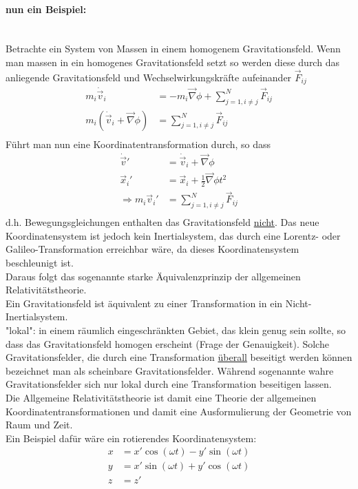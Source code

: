 \documentclass[a4paper]{article}
\begin{document}
\paragraph{nun ein Beispiel:}~\\
Betrachte ein System von Massen in einem homogenem Gravitationsfeld.
Wenn man massen in ein homogenes Gravitationsfeld setzt so werden diese durch
das anliegende Gravitationsfeld und Wechselwirkungskräfte aufeinander
$\vec{F}_{ij}$
\begin{align}
m_i \dot{\vec{v}}_i&=-m_i\vec{\nabla}\phi+\sum_{j=1,i\neq j}^N\vec{F}_{ij}\\
m_i (\dot{\vec{v}}_i+\vec{\nabla}\phi)&=\sum_{j=1,i\neq j}^N\vec{F}_{ij}\\
\end{align}
Führt man nun eine Koordinatentransformation durch, so dass
\begin{align}
\dot{\vec{v}}{}'&=\dot{\vec{v}}_i+\vec{\nabla}\phi\\
\vec{x}_i{}'&=\vec{x}_i+\frac{1}{2}\vec{\nabla}\phi t^2\\
\Rightarrow m_i\vec{v}_i{}'&=\sum_{j=1,i\neq j}^N\vec{F}_{ij}\\
\end{align}
d.h. Bewegungsgleichungen enthalten das Gravitationsfeld \underline{nicht}. Das
neue Koordinatensystem ist jedoch kein Inertialsystem, das durch eine
Lorentz- oder Galileo-Transformation erreichbar wäre, da dieses
Koordinatensystem beschleunigt ist.\\
Daraus folgt das sogenannte starke Äquivalenzprinzip der allgemeinen
Relativitätstheorie.\\
Ein Gravitationsfeld ist äquivalent zu einer Transformation in ein
Nicht- Inertialsystem.\\
"lokal": in einem räumlich eingeschränkten Gebiet, das klein genug sein sollte,
so dass das Gravitationsfeld homogen erscheint (Frage der Genauigkeit).
Solche Gravitationsfelder, die durch eine Transformation \underline{überall}
beseitigt werden können bezeichnet man als scheinbare Gravitationsfelder.
Während sogenannte wahre Gravitationsfelder sich nur lokal durch eine
Transformation beseitigen lassen.\\
Die Allgemeine Relativitätstheorie ist damit eine Theorie der allgemeinen
Koordinatentransformationen und damit eine Ausformulierung der Geometrie von
Raum und Zeit.\\ 
Ein Beispiel dafür wäre ein rotierendes Koordinatensystem:
\begin{align}
x&=x'\cos(\omega t)-y'\sin(\omega t)\\
y&=x'\sin(\omega t)+y'\cos(\omega t)\\
z&=z'
\end{align}
\end{document}
